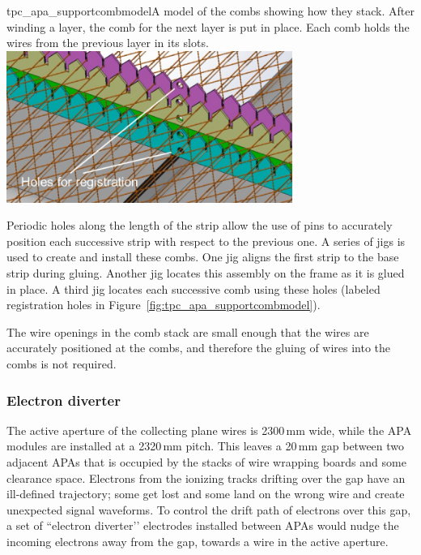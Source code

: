 \begin{cdrfigure}{tpc_apa_supportcombmodel}{A model of the combs showing how they stack.  After winding a layer, the comb for the next layer is put in place.  Each comb holds the wires from the previous layer in its slots.}
\includegraphics[width=0.7\textwidth]{figures/tpc_apa_supportcombmodel.png} 
\end{cdrfigure}

Periodic holes along the length of the strip allow the use of pins to accurately position each successive strip with respect to the previous one.  A series of jigs is used to create and install these combs.  One jig aligns the first strip to the base strip during gluing.  Another jig locates this assembly on the frame as it is glued in place. A third jig locates each successive comb using these holes (labeled registration holes in Figure~\ref{fig:tpc_apa_supportcombmodel}).

The wire openings in the comb stack are small enough that the wires are accurately positioned at the combs, and therefore the gluing of wires into the combs is not required.

\subsubsection{Electron diverter}
\label{sec:apa:electrondiverter}
 
The active aperture of the collecting plane wires is 2300\,mm wide, while the APA modules are installed at a 2320\,mm pitch.  This leaves a 20\,mm gap between two adjacent APAs that is occupied by the stacks of wire wrapping boards and some clearance space. Electrons from the ionizing tracks drifting over the gap have an ill-defined trajectory; some get lost and some land on the wrong wire and create unexpected signal waveforms.  To control the drift path of electrons over this gap, a set of ``electron diverter’’ electrodes installed between APAs would nudge the incoming electrons away from the gap, towards a wire in the active aperture. 
 
